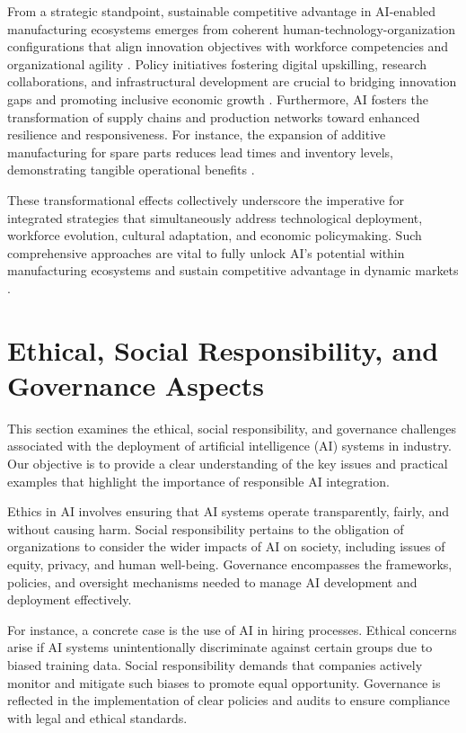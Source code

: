 \documentclass[sigconf]{acmart}
\begin{document}
From a strategic standpoint, sustainable competitive advantage in AI-enabled manufacturing ecosystems emerges from coherent human-technology-organization configurations that align innovation objectives with workforce competencies and organizational agility \cite{ref36}. Policy initiatives fostering digital upskilling, research collaborations, and infrastructural development are crucial to bridging innovation gaps and promoting inclusive economic growth \cite{ref38}. Furthermore, AI fosters the transformation of supply chains and production networks toward enhanced resilience and responsiveness. For instance, the expansion of additive manufacturing for spare parts reduces lead times and inventory levels, demonstrating tangible operational benefits \cite{ref9}.

These transformational effects collectively underscore the imperative for integrated strategies that simultaneously address technological deployment, workforce evolution, cultural adaptation, and economic policymaking. Such comprehensive approaches are vital to fully unlock AI’s potential within manufacturing ecosystems and sustain competitive advantage in dynamic markets \cite{ref19,ref36,ref38}.

\section{Ethical, Social Responsibility, and Governance Aspects}

This section examines the ethical, social responsibility, and governance challenges associated with the deployment of artificial intelligence (AI) systems in industry. Our objective is to provide a clear understanding of the key issues and practical examples that highlight the importance of responsible AI integration.

Ethics in AI involves ensuring that AI systems operate transparently, fairly, and without causing harm. Social responsibility pertains to the obligation of organizations to consider the wider impacts of AI on society, including issues of equity, privacy, and human well-being. Governance encompasses the frameworks, policies, and oversight mechanisms needed to manage AI development and deployment effectively.

For instance, a concrete case is the use of AI in hiring processes. Ethical concerns arise if AI systems unintentionally discriminate against certain groups due to biased training data. Social responsibility demands that companies actively monitor and mitigate such biases to promote equal opportunity. Governance is reflected in the implementation of clear policies and audits to ensure compliance with legal and ethical standards.
\end{document}
